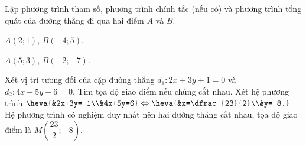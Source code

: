 \begin{bt}%
	Lập phương trình tham số, phương trình chính tắc (nếu có) và phương trình tổng quát của đường thẳng đi qua hai điểm $A$ và $B$.
	\begin{listEX}[1]
		\item  $A(2;1)$, $B(-4;5)$. 
		\item  $A(5;3)$, $B(-2;-7)$. 
		
	\end{listEX}
\end{bt}
\begin{bt}%
	Xét vị trí tương đối của cặp đường thẳng $d_1\colon 2x+3y+1=0$ và $d_2\colon 4x+5y-6=0$. Tìm tọa độ giao điểm nếu chúng cắt nhau.
	\loigiai
	{Xét hệ phương trình $\heva{&2x+3y=-1\\&4x+5y=6} \Leftrightarrow \heva{&x=\dfrac{23}{2}\\&y=-8.}$\\
		Hệ phương trình có nghiệm duy nhất nên hai đường thẳng cắt nhau, tọa độ giao điểm là $M\left(\dfrac{23}{2};-8\right)$.}
\end{bt}

